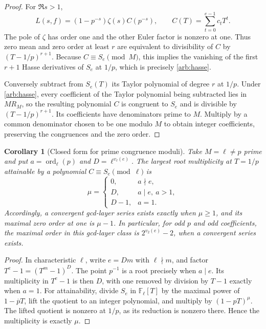 \documentclass[11pt,a4paper]{article}
\newtheorem{corollary}[theorem]{Corollary}
\theoremstyle{definition}
\theoremstyle{remark}
\numberwithin{equation}{section}
\begin{document}
\begin{proof}
For \(\Re s>1\),
\[
 L(s,f)=(1-p^{-s})\zeta(s)C(p^{-s}),
 \qquad C(T)=\sum_{t=0}^{e-1}c_tT^t.
\]
The pole of \(\zeta\) has order one and the other Euler factor
is nonzero at one.  Thus zero mean and zero order at least \(r\)
are equivalent to divisibility of \(C\) by
\((T-1/p)^{r+1}\).
Because \(C\equiv S_e\pmod M\), this implies the vanishing
of the first \(r+1\) Hasse derivatives of \(S_e\) at \(1/p\),
which is precisely \eqref{arb:hasse}.

Conversely subtract from \(S_e(T)\) its Taylor polynomial of
degree \(r\) at \(1/p\).  Under \eqref{arb:hasse}, every
coefficient of the Taylor polynomial being subtracted lies in \(MR_M\), so the resulting
polynomial \(C\) is congruent to \(S_e\) and is divisible by
\((T-1/p)^{r+1}\).
Its coefficients have denominators prime to \(M\).
Multiply by a common denominator chosen to be one modulo \(M\)
to obtain integer coefficients, preserving the congruences and
the zero order.
\end{proof}

\begin{corollary}[Closed form for prime congruence moduli]
\label{arb:gcdprime}
Take \(M=\ell\ne p\) prime and put
\(a=\operatorname{ord}_\ell(p)\) and
\(D=\ell^{v_\ell(e)}\).
The largest root multiplicity at \(T=1/p\) attainable by a
polynomial \(C\equiv S_e\pmod\ell\) is
\[
 \mu=
 \begin{cases}
 0,&a\nmid e,\\
 D,&a\mid e,\ a>1,\\
 D-1,&a=1.
 \end{cases}
\]
Accordingly, a convergent gcd-layer series exists exactly when
\(\mu\geq1\), and its maximal zero order at one is
\(\mu-1\).  In particular, for odd \(p\) and odd coefficients,
the maximal order in this gcd-layer class is
\(2^{v_2(e)}-2\), when a convergent series exists.
\end{corollary}

\begin{proof}
In characteristic \(\ell\), write \(e=Dm\) with
\(\ell\nmid m\), and factor
\(T^e-1=(T^m-1)^D\).
The point \(p^{-1}\) is a root precisely when \(a\mid e\).
Its multiplicity in \(T^e-1\) is then \(D\), with one removed
by division by \(T-1\) exactly when \(a=1\).
For attainability, divide \(S_e\) in \(\mathbb F_\ell[T]\)
by the maximal power of \(1-\overline pT\), lift the quotient
to an integer polynomial, and multiply by \((1-pT)^\mu\).
The lifted quotient is nonzero at \(1/p\), as its reduction is
nonzero there.  Hence the multiplicity is exactly \(\mu\).
\end{proof}
\end{document}

